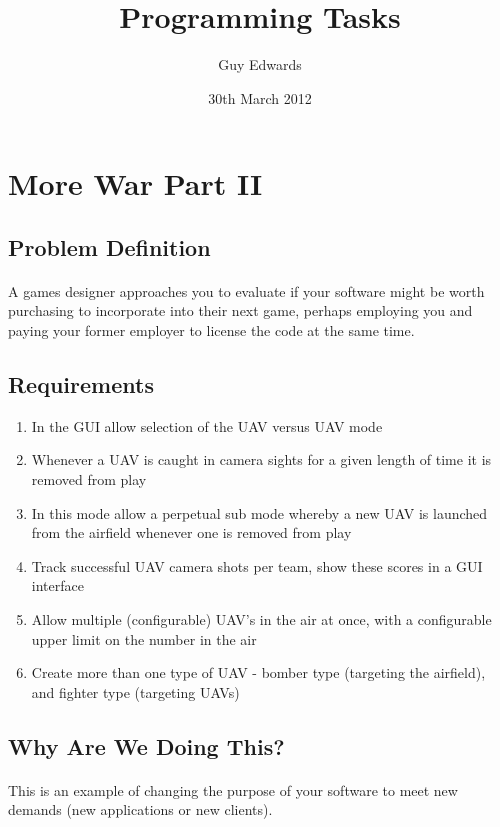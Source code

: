 \documentclass[11pt]{book}
\title{\textbf{Programming Tasks}}
\author{Guy Edwards}
\date{30th March 2012}
\begin{document}
\section{More War Part II}

\subsection{Problem Definition}

\paragraph{} A games designer approaches you to evaluate if your software
might be worth purchasing to incorporate into their next game, perhaps
employing you and paying your former employer to license the code at the same
time.

\subsection{Requirements}

\begin{enumerate}
\item In the GUI allow selection of the UAV versus UAV mode
\item Whenever a UAV is caught in camera sights for a given length of time it is removed from play
\item In this mode allow a perpetual sub mode whereby a new UAV is launched from the airfield whenever one is removed from play
\item Track successful UAV camera shots per team, show these scores in a GUI interface
\item Allow multiple (configurable) UAV's in the air at once, with a configurable upper limit on the number in the air
\item Create more than one type of UAV - bomber type (targeting the airfield), and fighter type (targeting UAVs)
\end{enumerate}

\subsection{Why Are We Doing This?}

\paragraph{} This is an example of changing the purpose of your software to
meet new demands (new applications or new clients).
\end{document}
